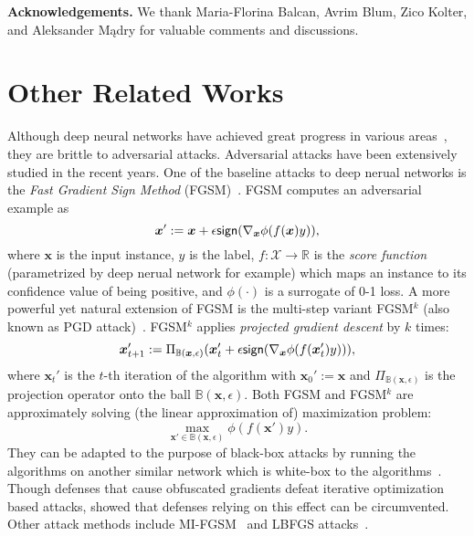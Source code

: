 \documentclass[11pt]{article}
\newcommand{\sign}{\textup{\textsf{sign}}}
\newcommand{\x}{\bm{x}}
\newcommand{\R}{\mathbb{R}}
\newcommand{\0}{\mathbf{0}}
\newcommand{\1}{\mathbf{1}}
\newcommand{\cX}{\mathcal{X}}
\newcommand{\bbB}{\mathbb{B}}
\begin{document}
\medskip
\noindent\textbf{Acknowledgements.} We thank Maria-Florina Balcan, Avrim Blum, Zico Kolter, and Aleksander Mądry for valuable comments and discussions.




\newpage
\onecolumn
\appendix


\section{Other Related Works}

\medskip
{} Although deep neural networks have achieved great progress in various areas~\cite{zhang2019deep,zhang2018stackelberg}, they are brittle to adversarial attacks. Adversarial attacks have been extensively studied in the recent
years. One of the baseline attacks to deep nerual networks is the \emph{Fast Gradient Sign Method} (FGSM)~\cite{goodfellow6572explaining}. FGSM computes an adversarial example as
\begin{equation*}
\x':=\x+\epsilon\sign(\nabla_{\x} \phi(f(\x)y)),
\end{equation*}
where $\x$ is the input instance, $y$ is the label, $f:\cX\rightarrow \R$ is the \emph{score function} (parametrized by deep nerual network for example) which maps an instance to its confidence value of being positive, and $\phi(\cdot)$ is a surrogate of 0-1 loss. A more powerful yet natural extension of FGSM is the multi-step variant FGSM$^k$ (also known as PGD attack)~\cite{kurakin2016adversarial}. FGSM$^k$ applies \emph{projected gradient descent} by $k$ times:
\begin{equation*}
\x_{t+1}':=\Pi_{\bbB(\x,\epsilon)}(\x_t'+\epsilon\sign(\nabla_{\x} \phi(f(\x_t')y))),
\end{equation*}
where $\x_t'$ is the $t$-th iteration of the algorithm with $\x_0':=\x$ and $\Pi_{\bbB(\x,\epsilon)}$ is the projection operator onto the ball $\bbB(\x,\epsilon)$.
Both FGSM and FGSM$^k$ are approximately solving (the linear approximation of) maximization problem:
\begin{equation*}
\max_{\x'\in\bbB(\x,\epsilon)} \phi(f(\x')y).
\end{equation*}
They can be adapted to the purpose of black-box attacks by running the algorithms on another similar network which is white-box to the algorithms~\cite{tramer2017ensemble}. Though defenses that cause obfuscated
gradients defeat iterative optimization based attacks, \cite{athalye2018obfuscated} showed that defenses relying on this
effect can be circumvented. Other attack methods include MI-FGSM~\cite{dong2018boosting} and LBFGS attacks~\cite{tabacof2016exploring}.
\end{document}
